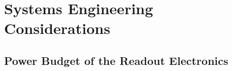 \section{Systems Engineering Considerations}
\label{sec:systems_engineering}


\subsection{Power Budget of the Readout Electronics}
\label{sec:power_budget}
